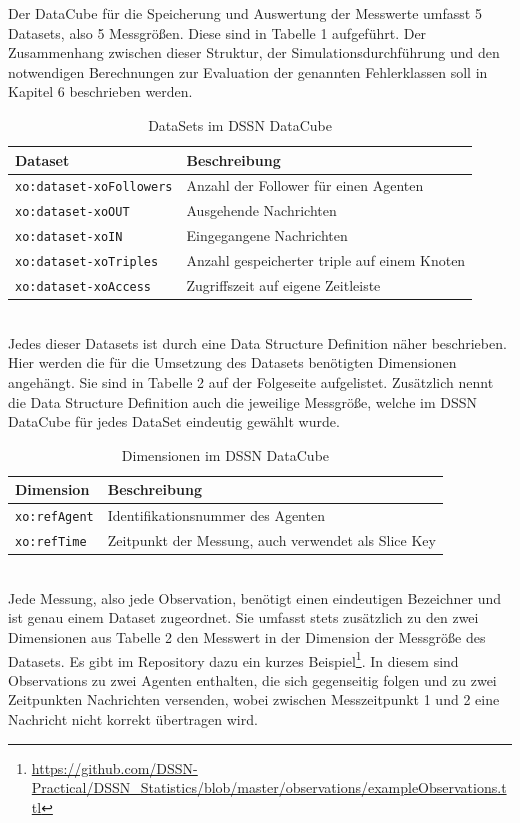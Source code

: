 \documentclass{article}
\begin{document}
Der DataCube für die Speicherung und Auswertung der Messwerte umfasst 5 Datasets, also 5 Messgrößen. Diese sind in Tabelle 1 aufgeführt. Der Zusammenhang zwischen dieser Struktur, der Simulationsdurchführung und den notwendigen Berechnungen zur Evaluation der genannten Fehlerklassen soll in Kapitel 6 beschrieben werden.
\begin{table}[ht]
\centering
\label{table1}
\begin{tabular}{|l|l|}
\hline
Dataset & Beschreibung \\ \hline
\texttt{xo:dataset-xoFollowers}       & Anzahl der Follower für einen Agenten            	\\ \hline
\texttt{xo:dataset-xoOUT}        & Ausgehende Nachrichten         \\ \hline
\texttt{xo:dataset-xoIN}        & Eingegangene Nachrichten             						\\ \hline
\texttt{xo:dataset-xoTriples}        & Anzahl gespeicherter triple auf einem Knoten        	\\ \hline
\texttt{xo:dataset-xoAccess}        & Zugriffszeit auf eigene Zeitleiste             		\\ \hline
\end{tabular}
\caption{DataSets im DSSN DataCube}
\end{table}\\
Jedes dieser Datasets ist durch eine Data Structure Definition näher beschrieben. Hier werden die für die Umsetzung des Datasets benötigten Dimensionen angehängt. Sie sind in Tabelle 2 auf der Folgeseite aufgelistet. Zusätzlich nennt die Data Structure Definition auch die jeweilige Messgröße, welche im DSSN DataCube für jedes DataSet eindeutig gewählt wurde.
\begin{table}[t]
\centering
\label{table2}
\begin{tabular}{|l|l|}
\hline
Dimension & Beschreibung \\ \hline
\texttt{xo:refAgent}       & Identifikationsnummer des Agenten            			\\ \hline
\texttt{xo:refTime}        & Zeitpunkt der Messung, auch verwendet als Slice Key	\\ \hline
\end{tabular}
\caption{Dimensionen im DSSN DataCube}
\end{table}\\
Jede Messung, also jede Observation, benötigt einen eindeutigen Bezeichner und ist genau einem Dataset zugeordnet. Sie umfasst stets zusätzlich zu den zwei Dimensionen aus Tabelle 2 den Messwert in der Dimension der Messgröße des Datasets. Es gibt im Repository dazu ein kurzes Beispiel\footnote{\url{https://github.com/DSSN-Practical/DSSN_Statistics/blob/master/observations/exampleObservations.ttl}}. In diesem sind Observations zu zwei Agenten enthalten, die sich gegenseitig folgen und zu zwei Zeitpunkten Nachrichten versenden, wobei zwischen Messzeitpunkt 1 und 2 eine Nachricht nicht korrekt übertragen wird.
\end{document}
